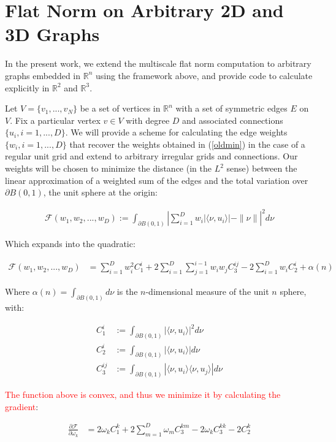 \documentclass[12pt]{article}
\begin{document}
\section{Flat Norm on Arbitrary 2D and 3D Graphs}

In the present work, we extend the multiscale flat norm computation to arbitrary graphs embedded in $\mathbb{R}^n$ using the framework above, and provide code to calculate explicitly in $\mathbb{R}^2$ and $\mathbb{R}^3$.

Let $V = \{v_1,...,v_N\}$ be a set of vertices in $\mathbb{R}^n$ with a set of symmetric edges $E$ on $V$. Fix a particular vertex $v \in V$ with degree $D$ and associated connections $\{u_i, i = 1,...,D\}$. We will provide a scheme for calculating the edge weights $\{w_i, i = 1,...,D\}$ that recover the weights obtained in (\ref{oldmin}) in the case of a regular unit grid and extend to arbitrary irregular grids and connections. Our weights will be chosen to minimize the distance (in the $L^2$ sense) between the linear approximation of a weighted sum of the edges and the total variation over $\partial B(0,1)$, the unit sphere at the origin:

\begin{align}
\mathcal{F}(w_1,w_2,...,w_D) := \int_{\partial B(0,1)} \left|\sum_{i=1}^D w_i |\langle \nu, u_i \rangle| - \| \nu \| \right|^2d\nu
\end{align}

Which expands into the quadratic:

\begin{align*}
\mathcal{F}(w_1,w_2,...,w_D) &= \sum_{i=1}^D w_i^2C_1^i + 2 \sum_{i=1}^D \sum_{j=1}^{i-1} w_i w_j C_3^{ij} - 2 \sum_{i=1}^D w_i C_2^i + \alpha(n)
\end{align*}

Where $\alpha(n) = \int_{\partial B(0,1)}d\nu$ is the $n$-dimensional measure of the unit $n$ sphere, with:

\begin{align*}
C_1^i &:= \int_{\partial B(0,1)} |\langle \nu,u_i \rangle|^2 d\nu\\
C_2^i &:= \int_{\partial B(0,1)} |\langle \nu,u_i \rangle| d\nu\\
C_3^{ij} &:= \int_{\partial B(0,1)} |\langle \nu,u_i \rangle \langle \nu, u_j \rangle| d\nu
\end{align*}

\textcolor{red}{The function above is convex, and thus we minimize it by calculating the gradient}:

\begin{align*}
	\frac{\partial \mathcal{F}}{\partial \omega_k}  &= 2 \omega_k C_1^k + 2 \sum_{m=1}^{D}\omega_{m}C_{3}^{km} - 2\omega_kC_3^{kk} - 2 C_2^k\\
\end{align*}
\end{document}
